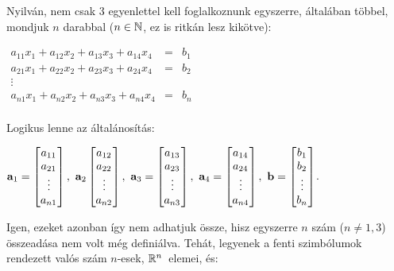 \documentclass[a4paper,11.5pt]{article}
\begin{document}
	\bigskip
	Nyilván, nem csak 3 egyenlettel kell foglalkoznunk egyszerre, általában többel, mondjuk $n$ darabbal ($n \in \mathbb{N}$, ez is ritkán lesz kikötve):
	\begin{center}
		$\begin{matrix}
		a_{11}x_{1} + a_{12}x_{2} + a_{13}x_{3} + a_{14}x_{4} &=& b_{1}\\
		a_{21}x_{1} + a_{22}x_{2} + a_{23}x_{3} + a_{24}x_{4} &=& b_{2}\\
		\vdots\\
		a_{n1}x_{1} + a_{n2}x_{2} + a_{n3}x_{3} + a_{n4}x_{4} &=& b_{n}\\
		\end{matrix}$
	\end{center}
	\noindent Logikus lenne az általánosítás:
	\begin{center}
		$\a_1=
		\begin{bmatrix}
		a_{11}\s \\
		a_{21}\s \\
		\vdots\\
		a_{n1}\s \\
		\end{bmatrix},~\a_2
		\begin{bmatrix}
		a_{12}\s \\
		a_{22}\s \\
		\vdots\\
		a_{n2}\s \\
		\end{bmatrix},~\a_3=
		\begin{bmatrix}
		a_{13}\s \\
		a_{23}\s \\
		\vdots\\
		a_{n3}\s \\
		\end{bmatrix},~\a_4=
		\begin{bmatrix}
		a_{14}\s \\
		a_{24}\s \\
		\vdots\\
		a_{n4}\s \\
		\end{bmatrix},~\b=
		\begin{bmatrix}
		b_{1}\s \\
		b_{2}\s \\
		\vdots\\
		b_{n}\s \\
		\end{bmatrix}$.
	\end{center}
	Igen, ezeket azonban így nem adhatjuk össze, hisz egyszerre $n$ szám ($n \not=1, 3$) összeadása nem volt még definiálva. Tehát, legyenek a fenti szimbólumok rendezett valós szám $n$-esek, $\mathbb{R}^{n}$~elemei, és:
	
\end{document}
